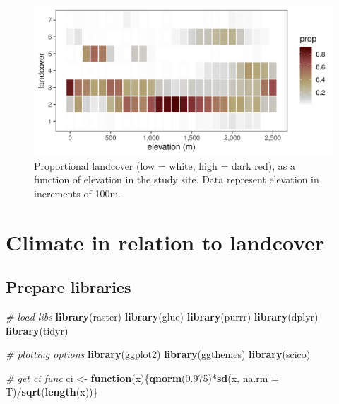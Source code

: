 \documentclass[]{article}
\newenvironment{Shaded}{}{}
\newcommand{\CommentTok}[1]{\textcolor[rgb]{0.38,0.63,0.69}{\textit{#1}}}
\newcommand{\ControlFlowTok}[1]{\textcolor[rgb]{0.00,0.44,0.13}{\textbf{#1}}}
\newcommand{\DataTypeTok}[1]{\textcolor[rgb]{0.56,0.13,0.00}{#1}}
\newcommand{\FloatTok}[1]{\textcolor[rgb]{0.25,0.63,0.44}{#1}}
\newcommand{\KeywordTok}[1]{\textcolor[rgb]{0.00,0.44,0.13}{\textbf{#1}}}
\newcommand{\NormalTok}[1]{#1}
\newcommand{\OperatorTok}[1]{\textcolor[rgb]{0.40,0.40,0.40}{#1}}
\newcommand{\StringTok}[1]{\textcolor[rgb]{0.25,0.44,0.63}{#1}}
\begin{document}
\begin{figure}
\centering
\includegraphics{figs/fig_lc_elev.png}
\caption{Proportional landcover (low = white, high = dark red), as a function of elevation in the study site. Data represent elevation in increments of 100m.}
\end{figure}

\hypertarget{climate-in-relation-to-landcover}{%
\section{Climate in relation to landcover}\label{climate-in-relation-to-landcover}}

\hypertarget{prepare-libraries-3}{%
\subsection{Prepare libraries}\label{prepare-libraries-3}}

\begin{Shaded}
\begin{Highlighting}[]
\CommentTok{# load libs}
\KeywordTok{library}\NormalTok{(raster)}
\KeywordTok{library}\NormalTok{(glue)}
\KeywordTok{library}\NormalTok{(purrr)}
\KeywordTok{library}\NormalTok{(dplyr)}
\KeywordTok{library}\NormalTok{(tidyr)}

\CommentTok{# plotting options}
\KeywordTok{library}\NormalTok{(ggplot2)}
\KeywordTok{library}\NormalTok{(ggthemes)}
\KeywordTok{library}\NormalTok{(scico)}

\CommentTok{# get ci func}
\NormalTok{ci <-}\StringTok{ }\ControlFlowTok{function}\NormalTok{(x)\{}\KeywordTok{qnorm}\NormalTok{(}\FloatTok{0.975}\NormalTok{)}\OperatorTok{*}\KeywordTok{sd}\NormalTok{(x, }\DataTypeTok{na.rm =}\NormalTok{ T)}\OperatorTok{/}\KeywordTok{sqrt}\NormalTok{(}\KeywordTok{length}\NormalTok{(x))\}}
\end{Highlighting}
\end{Shaded}
\end{document}
